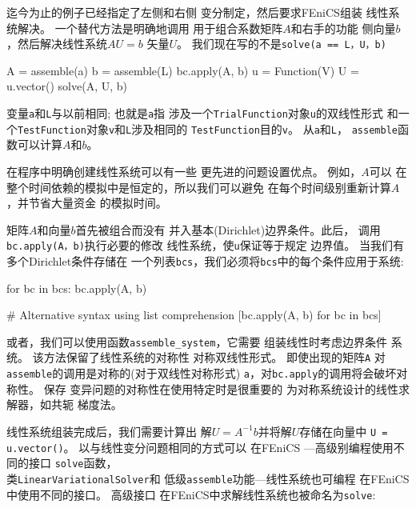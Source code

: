 
迄今为止的例子已经指定了左侧和右侧
变分制定，然后要求FEniCS组装
线性系统解决。 一个替代方法是明确地调用
用于组合系数矩阵$ A $和右手的功能
侧向量$b$，然后解决线性系统$AU=b$
矢量$U$。 我们现在写的不是\texttt{solve(a == L，U，b)}

\begin{python}
A = assemble(a)
b = assemble(L)
bc.apply(A, b)
u = Function(V)
U = u.vector()
solve(A, U, b)
\end{python}
变量\texttt{a}和\texttt{L}与以前相同; 也就是\texttt{a}指
涉及一个\texttt{TrialFunction}对象\texttt{u}的双线性形式
和一个\texttt{TestFunction}对象\texttt{v}和\texttt{L}涉及相同的
\texttt{TestFunction}目的\texttt{v}。 从\texttt{a}和\texttt{L}，
\texttt{assemble}函数可以计算$A$和$b$。

在程序中明确创建线性系统可以有一些
更先进的问题设置优点。 例如，$A$可以
在整个时间依赖的模拟中是恒定的，所以我们可以避免
在每个时间级别重新计算$A$，并节省大量资金
的模拟时间。

矩阵$A$和向量$b$首先被组合而没有
并入基本(Dirichlet)边界条件。此后，
调用\texttt{bc.apply(A，b)}执行必要的修改
线性系统，使\texttt{u}保证等于规定
边界值。 当我们有多个Dirichlet条件存储在
一个列表\texttt{bcs}，我们必须将\texttt{bcs}中的每个条件应用于系统:

\begin{python}
for bc in bcs:
    bc.apply(A, b)

# Alternative syntax using list comprehension
[bc.apply(A, b) for bc in bcs]
\end{python}


或者，我们可以使用函数\verb!assemble_system!，它需要
组装线性时考虑边界条件
系统。 该方法保留了线性系统的对称性
对称双线性形式。 即使出现的矩阵\texttt{A}
对\texttt{assemble}的调用是对称的(对于双线性对称形式)
\texttt{a}，对\texttt{bc.apply}的调用将会破坏对称性。 保存
变异问题的对称性在使用特定时是很重要的
为对称系统设计的线性求解器，如共轭
梯度法。

线性系统组装完成后，我们需要计算出
解$U=A^{-1}b$并将解$U$存储在向量中
\texttt{U = u.vector()}。 以与线性变分问题相同的方式可以
在FEniCS ---高级别编程使用不同的接口
\texttt{solve}函数，\\类\texttt{LinearVariationalSolver}和
低级\texttt{assemble}功能---线性系统也可编程
在FEniCS中使用不同的接口。 高级接口
在FEniCS中求解线性系统也被命名为\texttt{solve}:

